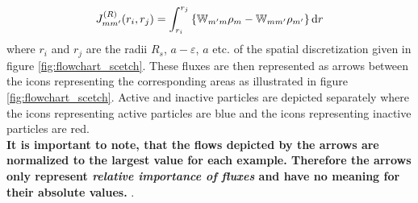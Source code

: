 \begin{equation}
    J_{mm'}^{(R)}(r_i,r_j) =\int_{r_i}^{r_j} \left\{ \mathbb{W}_{m'm}\rho_m - \mathbb{W}_{mm'} \rho_{m'} \right\} {\rm d} r
    \label{reaction_flux}
\end{equation}
where $r_i$ and $r_j$ are the radii $R_s$, $a-\varepsilon$, $a$ etc. of the spatial discretization given in figure \ref{fig:flowchart_scetch}.
These fluxes are then represented as arrows between the icons representing the corresponding areas as illustrated in figure \ref{fig:flowchart_scetch}. Active and inactive particles are depicted separately where the icons representing active particles are blue and the icons representing inactive particles are red. \\ \textbf{It is important to note, that the flows depicted by the arrows are normalized to the largest value for each example. Therefore the arrows only represent \emph{relative importance of fluxes} and have no meaning for their absolute values.}
. \\ \vspace{-1.3 cm}

